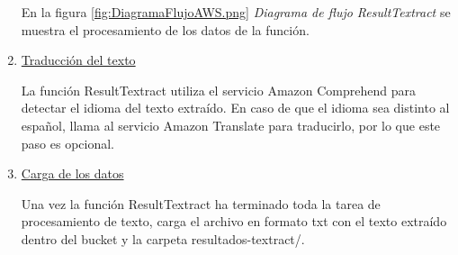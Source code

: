 \begin{enumerate}
    En la figura \ref{fig:DiagramaFlujoAWS.png} \textit{Diagrama de flujo ResultTextract} se muestra el procesamiento de los datos de la función.
    

    \item \underline{Traducción del texto}
    
    La función ResultTextract utiliza el servicio Amazon Comprehend para detectar el idioma del texto extraído. En caso de que el idioma sea distinto al español, llama al servicio Amazon Translate para traducirlo, por lo que este paso es opcional. 

    \item \underline{Carga de los datos}
    
    Una vez la función ResultTextract ha terminado toda la tarea de procesamiento de texto, carga el archivo en formato txt con el texto extraído dentro del bucket y la carpeta resultados-textract/.
    
\end{enumerate}

